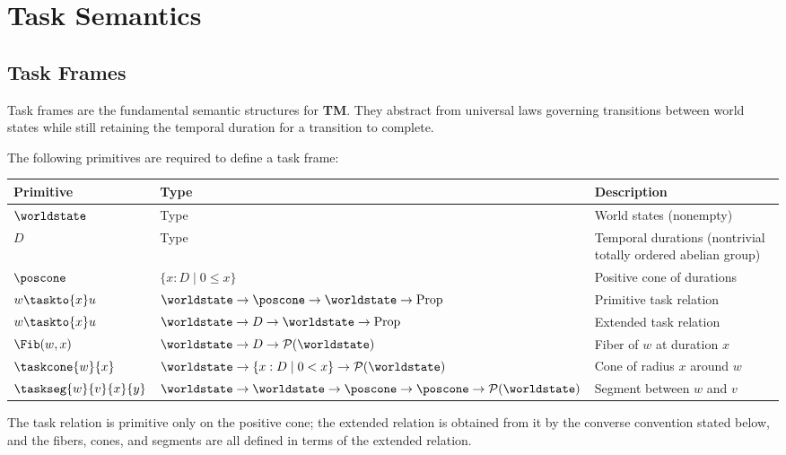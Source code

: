 \documentclass[../BimodalReference.tex]{subfiles}
\begin{document}
\section{Task Semantics}

\subsection{Task Frames}

Task frames are the fundamental semantic structures for \textbf{TM}.
They abstract from universal laws governing transitions between world states while still retaining the temporal duration for a transition to complete.

The following primitives are required to define a task frame:

\begin{center}
\begin{tabular}{@{}lll@{}}
\toprule
Primitive & Type & Description \\
\midrule
$\worldstate$ & Type & World states (nonempty) \\
$D$ & Type & Temporal durations (nontrivial totally ordered abelian group) \\
$\poscone$ & $\{x : D \mid 0 \leq x\}$ & Positive cone of durations \\
$w \taskto{x} u$ & $\worldstate \to \poscone \to \worldstate \to \text{Prop}$ & Primitive task relation \\
$w \taskto{x} u$ & $\worldstate \to D \to \worldstate \to \text{Prop}$ & Extended task relation \\
$\Fib(w, x)$ & $\worldstate \to D \to \mathcal{P}(\worldstate)$ & Fiber of $w$ at duration $x$ \\
$\taskcone{w}{x}$ & $\worldstate \to \{x : D \mid 0 < x\} \to \mathcal{P}(\worldstate)$ & Cone of radius $x$ around $w$ \\
$\taskseg{w}{v}{x}{y}$ & $\worldstate \to \worldstate \to \poscone \to \poscone \to \mathcal{P}(\worldstate)$ & Segment between $w$ and $v$ \\
\bottomrule
\end{tabular}
\end{center}

\noindent
The task relation is primitive only on the positive cone; the extended relation is obtained from it by the converse convention stated below, and the fibers, cones, and segments are all defined in terms of the extended relation.
\end{document}
